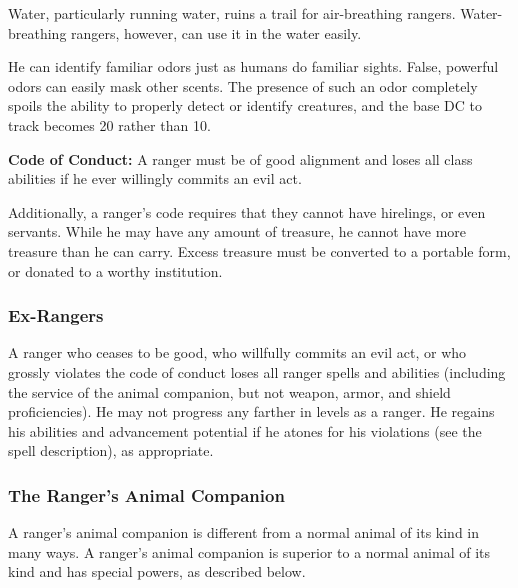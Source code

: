 Water, particularly running water, ruins a trail for air-breathing rangers. Water-breathing rangers, however, can use it in the water easily.

He can identify familiar odors just as humans do familiar sights. False, powerful odors can easily mask other scents. The presence of such an odor completely spoils the ability to properly detect or identify creatures, and the base  DC to track becomes 20 rather than 10.


\textbf{Code of Conduct:} A ranger must be of good alignment and loses all class abilities if he ever willingly commits an evil act.

Additionally, a ranger's code requires that they cannot have hirelings, or even servants. While he may have any amount of treasure, he cannot have more treasure than he can carry. Excess treasure must be converted to a portable form, or donated to a worthy institution.

\subsubsection{Ex-Rangers}
A ranger who ceases to be good, who willfully commits an evil act, or who grossly violates the code of conduct loses all ranger spells and abilities (including the service of the animal companion, but not weapon, armor, and shield proficiencies). He may not progress any farther in levels as a ranger. He regains his abilities and advancement potential if he atones for his violations (see the  spell description), as appropriate.

\subsubsection{The Ranger's Animal Companion}
A ranger's animal companion is different from a normal animal of its kind in many ways. A ranger's animal companion is superior to a normal animal of its kind and has special powers, as described below.


